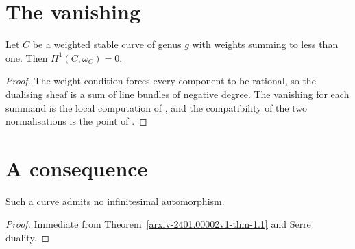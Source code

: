 
\section{The vanishing}\label{arxiv-2401.00002v1-sec-1}

\begin{theorem}\label{arxiv-2401.00002v1-thm-1.1}
\label{arxiv-2401.00002v1-thm:vanish}
Let $C$ be a weighted stable curve of genus $g$ with weights summing to less than one. Then $H^1(C, \omega_C) = 0$.
\end{theorem}

\begin{proof}
The weight condition forces every component to be rational, so the dualising sheaf is a sum of line bundles of negative degree. The vanishing for each summand is the local computation of \cite[Theorem 1.1]{other}, and the compatibility of the two normalisations is the point of \cite{third}.
\end{proof}

\section{A consequence}\label{arxiv-2401.00002v1-sec-2}

\begin{corollary}\label{arxiv-2401.00002v1-cor-2.1}
\label{arxiv-2401.00002v1-cor:rigid}
Such a curve admits no infinitesimal automorphism.
\end{corollary}

\begin{proof}
Immediate from Theorem~\ref{arxiv-2401.00002v1-thm-1.1} and Serre duality.
\end{proof}
